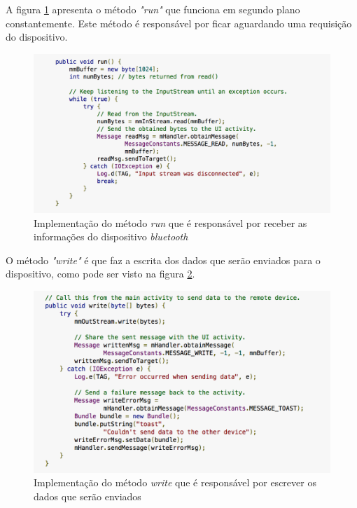 A figura \ref{img:trecho3} apresenta o método \textit{"run"} que funciona em segundo plano constantemente. Este método é responsável por ficar aguardando uma requisição do dispositivo.

\newpage

\graphicspath{{figuras/}}
\begin{figure}[!htb]
\centering
\includegraphics[scale=0.80]{run_method}
\caption{Implementação do método \textit{run} que é responsável por receber as informações do dispositivo \textit{bluetooth}}
\label{img:trecho3}
\end{figure}

O método \textit{"write"} é que faz a escrita dos dados que serão enviados para o dispositivo, como pode ser visto na figura \ref{img:trecho4}.

\graphicspath{{figuras/}}
\begin{figure}[!htb]
\centering
\includegraphics[scale=0.80]{write_method}
\caption{Implementação do método \textit{write} que é responsável por escrever os dados que serão enviados}
\label{img:trecho4}
\end{figure}

